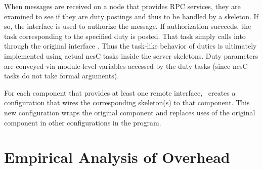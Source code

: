 When messages are received on a node that provides RPC services, they
are examined to see if they are duty postings and thus to be handled by
a skeleton. If so, the  interface is used to
authorize the message. If authorization succeeds, the task corresponding
to the specified duty is posted. That task simply calls into
 through the original interface
. Thus the task-like behavior of duties is ultimately
implemented using actual nesC tasks inside the server skeletons. Duty
parameters are conveyed via module-level variables accessed by the duty
tasks (since nesC tasks do not take formal arguments).

For each component that provides at least one remote interface,
\Sprocket\ creates a configuration 
that wires the corresponding
skeleton(s) to that component. This new configuration wraps the original
component and replaces uses of the original component in other
configurations in the program. 



\section{Empirical Analysis of Overhead}
\label{sec:empirical-results}
\label{section-empirical-results}

